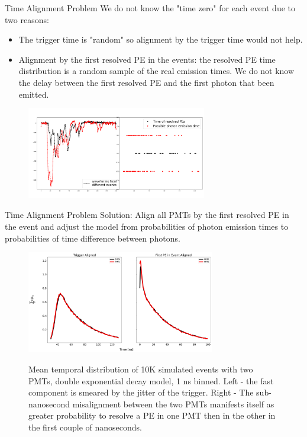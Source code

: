 \documentclass{beamer}
\begin{document}
\begin{frame}{Time Alignment Problem}
We do not know the "time zero" for each event due to two reasons:\\
\begin{itemize}
\item The trigger time is "random" so alignment by the trigger time would not help.
\item Alignment by the first resolved PE in the events: the resolved PE time distribution is a random sample of the real emission times. We do not know the delay between the first resolved PE and the first photon that been emitted.
\end{itemize}
\begin{figure}[h]
\includegraphics[width=0.7\textwidth]{alignment.png}
\end{figure}
\end{frame}

\begin{frame}{Time Alignment Problem}
Solution: Align all PMTs by the first resolved PE in the event and adjust the model from probabilities of photon emission times to probabilities of time difference between photons.  
\begin{figure}[h]
\includegraphics[width=0.73\textwidth]{sim.png}
\label{sim_temp}
\caption{Mean temporal distribution of 10K simulated events with two PMTs, double exponential decay model, 1 ns binned. Left - the fast component is smeared by the jitter of the trigger. Right - The sub-nanosecond misalignment between the two PMTs manifests itself as greater probability to resolve a PE in one PMT then in the other in the first couple of nanoseconds.}
\label{sim_temp} 
\end{figure}
\end{frame}
\end{document}
